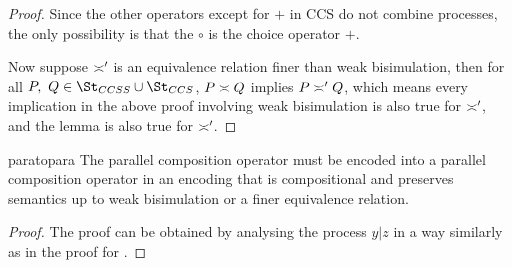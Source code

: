\documentclass[adraft,hidelinks]{eptcs}
\begin{document}
\begin{proof}
  Since the other operators except for $+$ in CCS do not combine processes, the only possibility is that the $\circ$ is the choice operator $+$.

  Now suppose $\asymp'$ is an equivalence relation finer than weak bisimulation, then for all $P,\ Q\in\St_{CCSS}\cup\St_{CCS}$, $P\asymp Q$ implies $P\asymp' Q$, which means every implication in the above proof involving weak bisimulation is also true for $\asymp'$, and the lemma is also true for $\asymp'$.
\end{proof}


\begin{lemma}{paratopara}
  The parallel composition operator must be encoded into a parallel composition operator in an encoding that is compositional and preserves semantics up to weak bisimulation or a finer equivalence relation.
\end{lemma}

\begin{proof}
  The proof can be obtained by analysing the process $y|z$ in a way similarly as in the proof for .
\end{proof}
\end{document}
